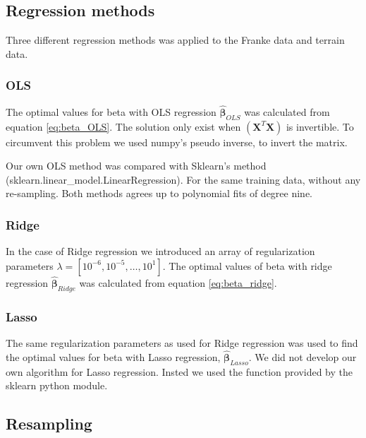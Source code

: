 \subsection{Regression methods}
Three different regression methods was applied to the Franke data and terrain
data.  
\subsubsection{OLS}
The optimal values for beta with OLS regression $\hat{\bm{\beta}  }_{OLS}$ was
calculated from equation
\eqref{eq:beta_OLS}. The solution only exist when $(\bm{X}^T \bm{X})$ is
invertible. To circumvent this problem we used numpy's pseudo inverse, to invert
the matrix.

Our own OLS method was compared with Sklearn's method
(sklearn.linear\_model.LinearRegression). For the same training data, without
any re-sampling. Both methods agrees up to polynomial fits of degree nine.  

\subsubsection{Ridge}
In the case of Ridge regression we introduced an array of regularization
parameters $\lambda = [10^{-6}, 10^{-5}, \hdots, 10^{1}]$. The optimal values
of beta with ridge regression $\hat{\bm{\beta } } _{Ridge} $ was calculated
from equation \eqref{eq:beta_ridge}. 

\subsubsection{Lasso}
The same regularization parameters as used for Ridge regression was used to find the
optimal values for beta with Lasso regression, $\hat{\bm{\beta } } _{Lasso} $. We did not develop our
own algorithm for Lasso regression. Insted we used the function provided by the
sklearn python module.  

\subsection{Resampling}



